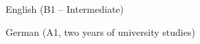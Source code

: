 \documentclass[11pt, a4paper]{awesome-cv}
\begin{document}

\begin{cvparagraph}

  \begin{cvitems} %
        \item {
        English (B1 -- Intermediate)}
        \item {German (A1, two years of university studies)}
      \end{cvitems}
      
\end{cvparagraph}



\end{document}
